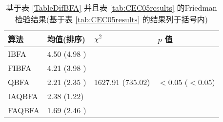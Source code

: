 \begin{table}[tb]
\begin{center}
\caption{基于表 \ref{TableDifBFA} 并且表  \ref{tab:CEC05results} 的Friedman检验结果(基于表 \ref{tab:CEC05results} 的结果列于括号内)}
\vspace{0.5em}\centering
\begin{tabularx}{0.62\textwidth}{p{}p{2.5cm}p{2.5cm}p{2.5cm}}
\hline
算法    & 均值(排序) &$\chi^2$   &$p$ 值\\
\midrule
IBFA &4.50 (4.98 )
&\multirow{6}{2.5cm}{1627.91 (735.02) }
&\multirow{6}{2.5cm}{$<0.05$ ($<0.05$)}\\
  FIBFA&4.21 (3.98 ) \\
  QBFA& 2.21 (2.35 )  \\
  IAQBFA &2.38 ($\bm{1.22}$) \\
FAQBFA& $\bm{1.69}$ (2.46 ) \\
\hline
\end{tabularx}
\label{Friedman_test2}
\end{center}
\end{table}
